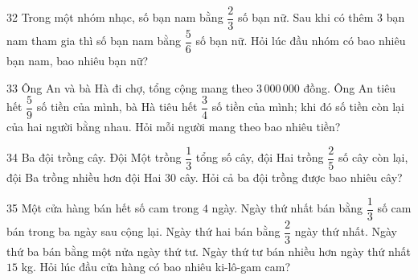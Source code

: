 \gap
\begin{probbox}{32}{}
Trong một nhóm nhạc, số bạn nam bằng $\dfrac23$ số bạn nữ. Sau khi có thêm $3$ bạn nam tham gia thì số bạn nam bằng $\dfrac56$ số bạn nữ. Hỏi lúc đầu nhóm có bao nhiêu bạn nam, bao nhiêu bạn nữ?
\end{probbox}
\gap
\begin{probbox}{33}{}
Ông An và bà Hà đi chợ, tổng cộng mang theo $3\,000\,000$ đồng. Ông An tiêu hết $\dfrac59$ số tiền của mình, bà Hà tiêu hết $\dfrac34$ số tiền của mình; khi đó số tiền còn lại của hai người bằng nhau. Hỏi mỗi người mang theo bao nhiêu tiền?
\end{probbox}
\gap
\begin{probbox}{34}{}
Ba đội trồng cây. Đội Một trồng $\dfrac13$ tổng số cây, đội Hai trồng $\dfrac25$ số cây còn lại, đội Ba trồng nhiều hơn đội Hai $30$ cây. Hỏi cả ba đội trồng được bao nhiêu cây?
\end{probbox}
\gap
\begin{probbox}{35}{}
Một cửa hàng bán hết số cam trong $4$ ngày. Ngày thứ nhất bán bằng $\dfrac13$ số cam bán trong ba ngày sau cộng lại. Ngày thứ hai bán bằng $\dfrac23$ ngày thứ nhất. Ngày thứ ba bán bằng một nửa ngày thứ tư. Ngày thứ tư bán nhiều hơn ngày thứ nhất $15$ kg. Hỏi lúc đầu cửa hàng có bao nhiêu ki-lô-gam cam?
\end{probbox}
